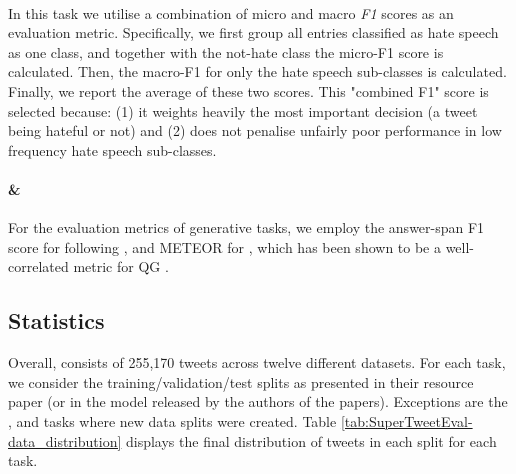 \paragraph{{\TweetHate}} In this task we utilise a combination of micro and macro \textit{F1} scores as an evaluation metric. Specifically, we first group all entries classified as hate speech as one class, and together with the not-hate class the micro-F1 score is calculated. Then, the macro-F1 for only the hate speech sub-classes is calculated. Finally, we report the average of these two scores. This "combined F1" score is selected because: (1) it weights heavily the most important decision (a tweet being hateful or not) and (2) does not penalise unfairly poor performance in low frequency hate speech sub-classes.

\paragraph{{\TweetQA} \& {\TweetQG}} For the evaluation metrics of generative tasks, we employ the answer-span F1 score for {\TweetQA} following , and METEOR \cite{denkowski-lavie-2014-meteor} for {\TweetQG}, which has been shown to be a well-correlated metric for QG \cite{ushio-etal-2022-generative}.


\subsection{Statistics}
\label{sec:statistics}
Overall, {\DATASET} consists of 255,170 tweets across twelve different datasets. For each task, we consider the training/validation/test splits as presented in their resource paper (or in the model released by the authors of the papers). Exceptions are the {\TweetHate}, {\TweetSimilarity} and {\TweetEmoji} tasks where new data splits were created. Table \ref{tab:SuperTweetEval-data_distribution} displays the final distribution of tweets in each split  for each task.


